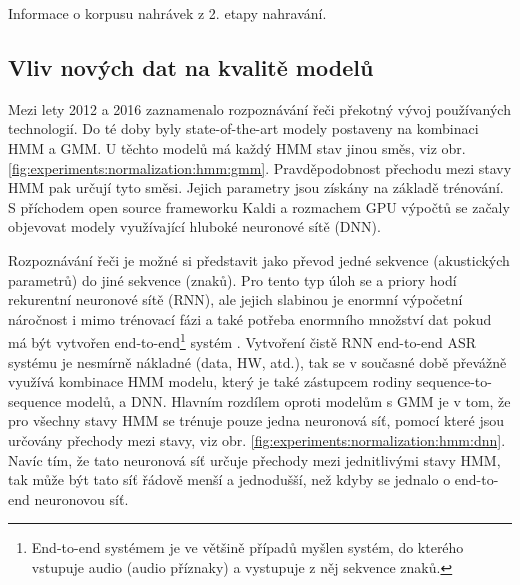 \begin{table}[htpb]
  \centering
  \def\arraystretch{1.5}
  \caption{Informace o korpusu nahrávek z 2. etapy nahravání.}
  \label{tab:experiments:normalization:recording}
\end{table}

\subsection{Vliv nových dat na kvalitě modelů}
\label{chap:experiments:normalization:corpus}

Mezi lety 2012 a 2016 zaznamenalo rozpoznávání řeči překotný vývoj používaných technologií. Do té doby byly state-of-the-art modely postaveny na kombinaci HMM a  GMM. U těchto modelů má každý HMM stav jinou směs, viz obr. \ref{fig:experiments:normalization:hmm:gmm}. Pravděpodobnost přechodu mezi stavy HMM pak určují tyto směsi. Jejich parametry jsou získány na základě trénování. S příchodem open source frameworku Kaldi \cite{Kaldi2011} a rozmachem GPU výpočtů se začaly objevovat modely využívající hluboké neuronové sítě (DNN).

Rozpoznávání řeči je možné si představit jako převod jedné sekvence (akustických parametrů) do jiné sekvence (znaků). Pro tento typ úloh se a priory hodí rekurentní neuronové sítě (RNN), ale jejich slabinou je enormní výpočetní náročnost i mimo trénovací fázi a také potřeba enormního množství dat pokud má být vytvořen end-to-end\footnote{End-to-end systémem je ve většině případů myšlen systém, do kterého vstupuje audio (audio příznaky) a vystupuje z něj sekvence znaků.} systém \cite{Hannun2014}. Vytvoření čistě RNN end-to-end ASR systému je nesmírně nákladné (data, HW, atd.), tak se v současné době převážně využívá kombinace HMM modelu, který je také zástupcem rodiny sequence-to-sequence modelů, a DNN. Hlavním rozdílem oproti modelům s GMM je v tom, že pro všechny stavy HMM se trénuje pouze jedna neuronová síť, pomocí které jsou určovány přechody mezi stavy, viz obr. \ref{fig:experiments:normalization:hmm:dnn}. Navíc tím, že tato neuronová síť určuje  přechody mezi jednitlivými stavy HMM, tak může být tato síť řádově menší a jednodušší, než kdyby se jednalo o end-to-end neuronovou síť.


